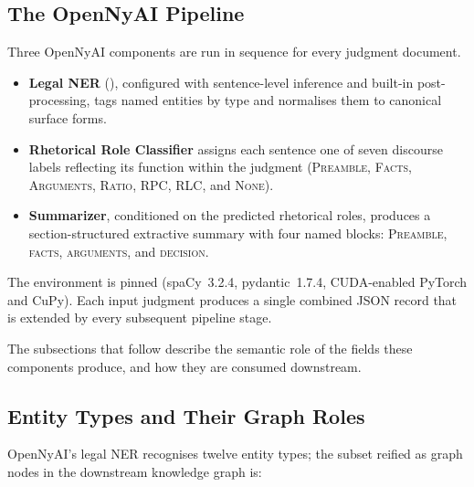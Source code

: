 \subsection{The OpenNyAI Pipeline}

Three OpenNyAI components are run in sequence for every judgment document.

\begin{itemize}
  \item \textbf{Legal NER} (), configured with
    sentence-level inference and built-in post-processing, tags named
    entities by type and normalises them to canonical surface forms.
  \item \textbf{Rhetorical Role Classifier} assigns each sentence one of seven
    discourse labels reflecting its function within the judgment
    (\textsc{Preamble}, \textsc{Facts}, \textsc{Arguments}, \textsc{Ratio},
    \textsc{RPC}, \textsc{RLC}, and \textsc{None}).
  \item \textbf{Summarizer}, conditioned on the predicted rhetorical roles,
    produces a section-structured extractive summary with four named blocks:
    \textsc{Preamble}, \textsc{facts}, \textsc{arguments}, and
    \textsc{decision}.
\end{itemize}

The environment is pinned (spaCy~3.2.4, pydantic~1.7.4, CUDA-enabled PyTorch
and CuPy). Each input judgment produces a
single combined JSON record that is extended by every subsequent pipeline stage.

The subsections that follow describe the semantic role of the fields these
components produce, and how they are consumed downstream.

\subsection{Entity Types and Their Graph Roles}

OpenNyAI's legal NER recognises twelve entity types; the subset reified as graph
nodes in the downstream knowledge graph is:

